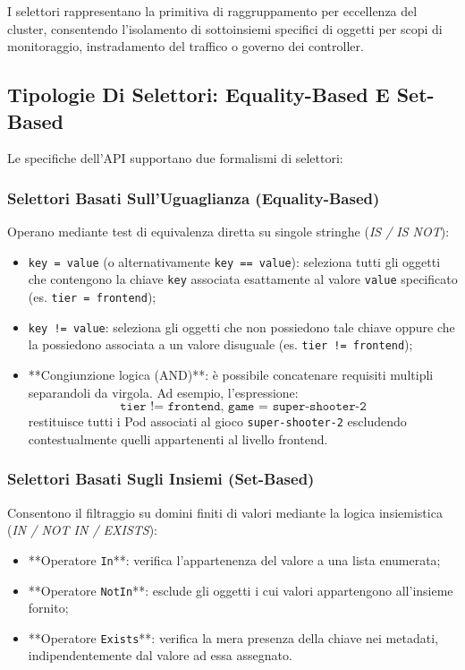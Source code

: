 \documentclass[11pt, a4paper]{article}
\begin{document}
I selettori rappresentano la primitiva di raggruppamento per eccellenza del cluster, consentendo l'isolamento di sottoinsiemi specifici di oggetti per scopi di monitoraggio, instradamento del traffico o governo dei controller.

\subsection{Tipologie Di Selettori: Equality-Based E Set-Based}

Le specifiche dell'API supportano due formalismi di selettori:

\subsubsection{Selettori Basati Sull'Uguaglianza (Equality-Based)}
Operano mediante test di equivalenza diretta su singole stringhe (\emph{IS / IS NOT}):
\begin{itemize}[noitemsep]
    \item \texttt{key = value} (o alternativamente \texttt{key == value}): seleziona tutti gli oggetti che contengono la chiave \texttt{key} associata esattamente al valore \texttt{value} specificato (es. \texttt{tier = frontend});
    \item \texttt{key != value}: seleziona gli oggetti che non possiedono tale chiave oppure che la possiedono associata a un valore disuguale (es. \texttt{tier != frontend});
    \item **Congiunzione logica (AND)**: è possibile concatenare requisiti multipli separandoli da virgola. Ad esempio, l'espressione:
    \[
    \texttt{tier != frontend, game = super-shooter-2}
    \]
    restituisce tutti i Pod associati al gioco \texttt{super-shooter-2} escludendo contestualmente quelli appartenenti al livello frontend.
\end{itemize}

\subsubsection{Selettori Basati Sugli Insiemi (Set-Based)}
Consentono il filtraggio su domini finiti di valori mediante la logica insiemistica (\emph{IN / NOT IN / EXISTS}):
\begin{itemize}[noitemsep]
    \item **Operatore \texttt{In}**: verifica l'appartenenza del valore a una lista enumerata;
    \item **Operatore \texttt{NotIn}**: esclude gli oggetti i cui valori appartengono all'insieme fornito;
    \item **Operatore \texttt{Exists}**: verifica la mera presenza della chiave nei metadati, indipendentemente dal valore ad essa assegnato.
\end{itemize}
\end{document}
